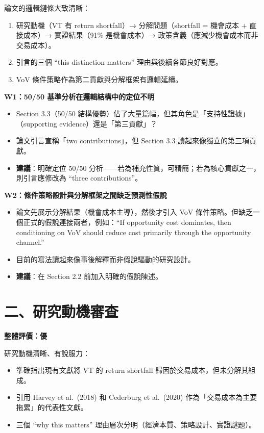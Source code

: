 \documentclass[12pt,a4paper]{article}
\begin{document}
論文的邏輯鏈條大致清晰：

\begin{enumerate}[leftmargin=2em]
\item 研究動機（VT 有 return shortfall）→ 分解問題（shortfall = 機會成本 + 直接成本）→ 實證結果（91\% 是機會成本）→ 政策含義（應減少機會成本而非交易成本）。
\item 引言的三個 ``this distinction matters'' 理由與後續各節良好對應。
\item VoV 條件策略作為第二貢獻與分解框架有邏輯延續。
\end{enumerate}

\textcolor{warncolor}{\textbf{W1：50/50 基準分析在邏輯結構中的定位不明}}

\begin{itemize}[leftmargin=2em]
\item Section 3.3（50/50 結構優勢）佔了大量篇幅，但其角色是「支持性證據」（supporting evidence）還是「第三貢獻」？
\item 論文引言宣稱「two contributions」，但 Section 3.3 讀起來像獨立的第三項貢獻。
\item \textbf{建議}：明確定位 50/50 分析——若為補充性質，可精簡；若為核心貢獻之一，則引言應修改為 ``three contributions''。
\end{itemize}

\textcolor{warncolor}{\textbf{W2：條件策略設計與分解框架之間缺乏預測性假說}}

\begin{itemize}[leftmargin=2em]
\item 論文先展示分解結果（機會成本主導），然後才引入 VoV 條件策略。但缺乏一個正式的假說連接兩者，例如：``If opportunity cost dominates, then conditioning on VoV should reduce cost primarily through the opportunity channel.''
\item 目前的寫法讀起來像事後解釋而非假說驅動的研究設計。
\item \textbf{建議}：在 Section 2.2 前加入明確的假說陳述。
\end{itemize}

\section*{二、研究動機審查}

\textcolor{okgreen}{\textbf{整體評價：優}}

研究動機清晰、有說服力：
\begin{itemize}[leftmargin=2em]
\item 準確指出現有文獻將 VT 的 return shortfall 歸因於交易成本，但未分解其組成。
\item 引用 Harvey et al.\ (2018) 和 Cederburg et al.\ (2020) 作為「交易成本為主要拖累」的代表性文獻。
\item 三個 ``why this matters'' 理由層次分明（經濟本質、策略設計、實證謎題）。
\end{itemize}
\end{document}
